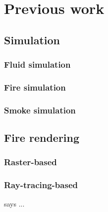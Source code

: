 \chapter{Previous work}

\section{Simulation}

\subsection{Fluid simulation}

\subsection{Fire simulation}

\subsection{Smoke simulation}

\section{Fire rendering}

\subsection{Raster-based}

\subsection{Ray-tracing-based}

\cite{Pegoraro2006} says ...